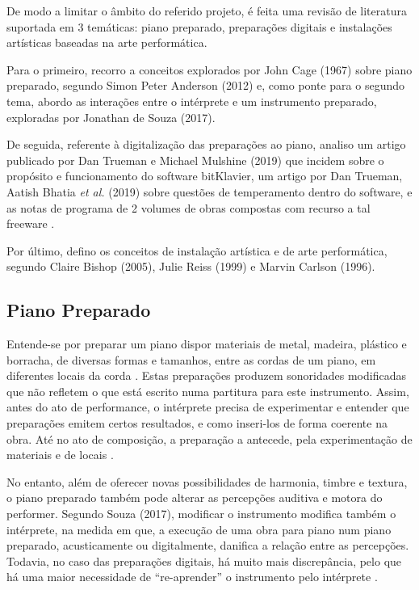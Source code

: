 \documentclass[../main.tex]{subfiles}
\begin{document}
De modo a limitar o âmbito do referido projeto, é feita uma revisão de literatura suportada em 3 temáticas: piano preparado, preparações digitais e instalações artísticas baseadas na arte performática.

Para o primeiro, recorro a conceitos explorados por John Cage (1967)\cite{cage1961} sobre piano preparado, segundo Simon Peter Anderson (2012)\cite{anderson2012} e, como ponte para o segundo tema, abordo as interações entre o intérprete e um instrumento preparado, exploradas por Jonathan de Souza (2017)\cite{souza2017}.

De seguida, referente à digitalização das preparações ao piano, analiso um artigo publicado por Dan Trueman e Michael Mulshine (2019)\cite{trueman2019} que incidem sobre o propósito e funcionamento do software bitKlavier, um artigo por Dan Trueman, Aatish Bhatia \textsl{et al.} (2019)\cite{trueman2019b} sobre questões de temperamento dentro do software, e as notas de programa de 2 volumes de obras compostas com recurso a tal freeware \cite{trueman2015a,trueman2015b}.

Por último, defino os conceitos de instalação artística e de arte performática, segundo Claire Bishop (2005)\cite{bishop2005}, Julie Reiss (1999)\cite{reiss1999} e Marvin Carlson (1996)\cite{carlson1996}.

\subsection*{Piano Preparado}
Entende-se por preparar um piano dispor materiais de metal, madeira, plástico e borracha, de diversas formas e tamanhos, entre as cordas de um piano, em diferentes locais da corda \cite{anderson2012}.
Estas preparações produzem sonoridades modificadas que não refletem o que está escrito numa partitura para este instrumento.
Assim, antes do ato de performance, o intérprete precisa de experimentar e entender que preparações emitem certos resultados, e como inseri-los de forma coerente na obra.
Até no ato de composição, a preparação a antecede, pela experimentação de materiais e de locais \cite{cage1958}.

No entanto, além de oferecer novas possibilidades de harmonia, timbre e textura, o piano preparado também pode alterar as percepções auditiva e motora do performer.
Segundo Souza (2017), modificar o instrumento modifica também o intérprete, na medida em que, a execução de uma obra para piano num piano preparado, acusticamente ou digitalmente, danifica a relação entre as percepções.
Todavia, no caso das preparações digitais, há muito mais discrepância, pelo que há uma maior necessidade de “re-aprender” o instrumento pelo intérprete \cite{souza2017}.
\end{document}
